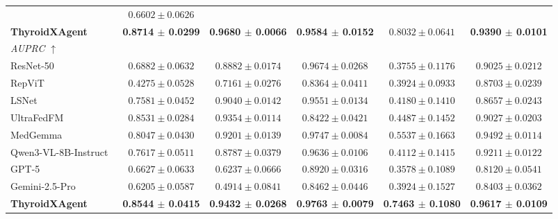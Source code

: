 \begin{table}[p]
\begin{threeparttable}
\begin{tabular}{lccccc}
& $0.6602 \pm 0.0626$ \\
\rowcolor{lightgray}
\textbf{ThyroidXAgent}
& \textbf{0.8714 $\pm$ 0.0299}
& \textbf{0.9680 $\pm$ 0.0066}
& \textbf{0.9584 $\pm$ 0.0152}
& $0.8032 \pm 0.0641$
& \textbf{0.9390 $\pm$ 0.0101} \\
\midrule
\multicolumn{6}{l}{\textit{AUPRC $\uparrow$}} \\
\midrule
ResNet-50~\cite{he2016deep}
& $0.6882 \pm 0.0632$
& $0.8882 \pm 0.0174$
& $0.9674 \pm 0.0268$
& $0.3755 \pm 0.1176$
& $0.9025 \pm 0.0212$ \\
RepViT~\cite{wang2023repvit}
& $0.4275 \pm 0.0528$
& $0.7161 \pm 0.0276$
& $0.8364 \pm 0.0411$
& $0.3924 \pm 0.0933$
& $0.8703 \pm 0.0239$ \\
LSNet~\cite{wang2025lsnet}
& $0.7581 \pm 0.0452$
& $0.9040 \pm 0.0142$
& $0.9551 \pm 0.0134$
& $0.4180 \pm 0.1410$
& $0.8657 \pm 0.0243$ \\
UltraFedFM~\cite{jiang2025pretraining}
& $0.8531 \pm 0.0284$
& $0.9354 \pm 0.0114$
& $0.8422 \pm 0.0421$
& $0.4487 \pm 0.1452$
& $0.9027 \pm 0.0203$ \\
MedGemma~\cite{sellergren2025medgemma}
& $0.8047 \pm 0.0430$
& $0.9201 \pm 0.0139$
& $0.9747 \pm 0.0084$
& $0.5537 \pm 0.1663$
& $0.9492 \pm 0.0114$ \\
Qwen3-VL-8B-Instruct~\cite{bai2025qwen3}
& $0.7617 \pm 0.0511$
& $0.8787 \pm 0.0379$
& $0.9636 \pm 0.0106$
& $0.4112 \pm 0.1415$
& $0.9211 \pm 0.0122$ \\
GPT-5~\cite{openai2025gpt5systemcard}
& $0.6627 \pm 0.0633$
& $0.6237 \pm 0.0666$
& $0.8920 \pm 0.0316$
& $0.3578 \pm 0.1089$
& $0.8120 \pm 0.0541$ \\
Gemini-2.5-Pro~\cite{comanici_gemini_2025}
& $0.6205 \pm 0.0587$
& $0.4914 \pm 0.0841$
& $0.8462 \pm 0.0446$
& $0.3924 \pm 0.1527$
& $0.8403 \pm 0.0362$ \\
\rowcolor{lightgray}
\textbf{ThyroidXAgent}
& \textbf{0.8544 $\pm$ 0.0415}
& \textbf{0.9432 $\pm$ 0.0268}
& \textbf{0.9763 $\pm$ 0.0079}
& \textbf{0.7463 $\pm$ 0.1080}
& \textbf{0.9617 $\pm$ 0.0109} \\
\bottomrule
\end{tabular}
\end{threeparttable}
\end{table}

\clearpage
